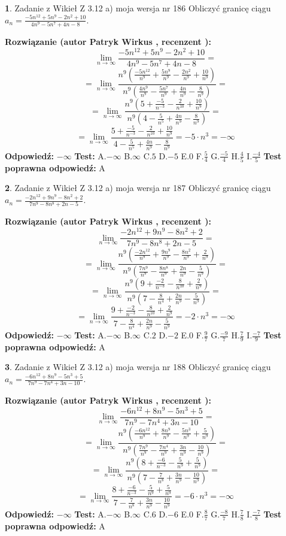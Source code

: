 \documentclass[12pt, a4paper]{article}
\theoremstyle{definition} %
\newtheorem{zad}{}
\newcommand{\zadStart}[1]{\begin{zad}#1\newline}
\newcommand{\zadStop}{\end{zad}}
\newcommand{\rozwStart}[2]{\noindent \textbf{Rozwiązanie (autor #1 , recenzent #2): }\newline}
\newcommand{\rozwStop}{\newline}
\newcommand{\odpStart}{\noindent \textbf{Odpowiedź:}\newline}
\newcommand{\odpStop}{\newline}
\newcommand{\testStart}{\noindent \textbf{Test:}\newline}
\newcommand{\testStop}{\newline}
\newcommand{\kluczStart}{\noindent \textbf{Test poprawna odpowiedź:}\newline}
\newcommand{\kluczStop}{\newline}
\begin{document}
\zadStart{Zadanie z Wikieł Z 3.12 a) moja wersja nr 186}
Obliczyć granicę ciągu $a_{n}=\frac{-5n^{12}+5n^{9}-2n^{2}+10}{4n^{9}-5n^{7}+4n-8}$.
\zadStop
\rozwStart{Patryk Wirkus}{}
$$\lim\limits_{n\to\infty}\frac{-5n^{12}+5n^{9}-2n^{2}+10}{4n^{9}-5n^{7}+4n-8}=$$
$$=\lim\limits_{n\to\infty}\frac{n^{9}\left(\frac{-5n^{12}}{n^{9}}+\frac{5n^{9}}{n^{9}}-\frac{2n^{2}}{n^{9}}+\frac{10}{n^{9}}\right)}{n^{9}\left(\frac{4n^{9}}{n^{9}}-\frac{5n^{7}}{n^{9}}+\frac{4n}{n^{9}}-\frac{8}{n^{9}}\right)}=$$
$$=\lim\limits_{n\to\infty}\frac{n^{9}\left(5+\frac{-5}{n^{-3}}-\frac{2}{n^{10}}+\frac{10}{n^{9}}\right)}
{n^{9}\left(4-\frac{5}{n^{5}}+\frac{4n}{n^{9}}-\frac{8}{n^{9}}\right)}=$$
$$=\lim\limits_{n\to\infty}\frac{5+\frac{-5}{n^{-3}}-\frac{2}{n^{10}}+\frac{10}{n^{9}}}{4-\frac{5}{n^{5}}+\frac{4n}{n^{9}}-\frac{8}{n^{9}}}=-5\cdot n^{3} = -\infty$$
\rozwStop
\odpStart
$-\infty$
\odpStop
\testStart
A.$-\infty$
B.$\infty$
C.$5$
D.$-5$
E.$0$
F.$\frac{5}{4}$
G.$\frac{-5}{4}$
H.$\frac{4}{5}$
I.$\frac{-4}{5}$
\testStop
\kluczStart
A
\kluczStop



\zadStart{Zadanie z Wikieł Z 3.12 a) moja wersja nr 187}
Obliczyć granicę ciągu $a_{n}=\frac{-2n^{12}+9n^{9}-8n^{2}+2}{7n^{9}-8n^{8}+2n-5}$.
\zadStop
\rozwStart{Patryk Wirkus}{}
$$\lim\limits_{n\to\infty}\frac{-2n^{12}+9n^{9}-8n^{2}+2}{7n^{9}-8n^{8}+2n-5}=$$
$$=\lim\limits_{n\to\infty}\frac{n^{9}\left(\frac{-2n^{12}}{n^{9}}+\frac{9n^{9}}{n^{9}}-\frac{8n^{2}}{n^{9}}+\frac{2}{n^{9}}\right)}{n^{9}\left(\frac{7n^{9}}{n^{9}}-\frac{8n^{8}}{n^{9}}+\frac{2n}{n^{9}}-\frac{5}{n^{9}}\right)}=$$
$$=\lim\limits_{n\to\infty}\frac{n^{9}\left(9+\frac{-2}{n^{-3}}-\frac{8}{n^{10}}+\frac{2}{n^{9}}\right)}
{n^{9}\left(7-\frac{8}{n^{4}}+\frac{2n}{n^{9}}-\frac{5}{n^{9}}\right)}=$$
$$=\lim\limits_{n\to\infty}\frac{9+\frac{-2}{n^{-3}}-\frac{8}{n^{10}}+\frac{2}{n^{9}}}{7-\frac{8}{n^{4}}+\frac{2n}{n^{9}}-\frac{5}{n^{9}}}=-2\cdot n^{3} = -\infty$$
\rozwStop
\odpStart
$-\infty$
\odpStop
\testStart
A.$-\infty$
B.$\infty$
C.$2$
D.$-2$
E.$0$
F.$\frac{9}{7}$
G.$\frac{-9}{7}$
H.$\frac{7}{9}$
I.$\frac{-7}{9}$
\testStop
\kluczStart
A
\kluczStop



\zadStart{Zadanie z Wikieł Z 3.12 a) moja wersja nr 188}
Obliczyć granicę ciągu $a_{n}=\frac{-6n^{12}+8n^{9}-5n^{3}+5}{7n^{9}-7n^{4}+3n-10}$.
\zadStop
\rozwStart{Patryk Wirkus}{}
$$\lim\limits_{n\to\infty}\frac{-6n^{12}+8n^{9}-5n^{3}+5}{7n^{9}-7n^{4}+3n-10}=$$
$$=\lim\limits_{n\to\infty}\frac{n^{9}\left(\frac{-6n^{12}}{n^{9}}+\frac{8n^{9}}{n^{9}}-\frac{5n^{3}}{n^{9}}+\frac{5}{n^{9}}\right)}{n^{9}\left(\frac{7n^{9}}{n^{9}}-\frac{7n^{4}}{n^{9}}+\frac{3n}{n^{9}}-\frac{10}{n^{9}}\right)}=$$
$$=\lim\limits_{n\to\infty}\frac{n^{9}\left(8+\frac{-6}{n^{-3}}-\frac{5}{n^{9}}+\frac{5}{n^{9}}\right)}
{n^{9}\left(7-\frac{7}{n^{8}}+\frac{3n}{n^{9}}-\frac{10}{n^{9}}\right)}=$$
$$=\lim\limits_{n\to\infty}\frac{8+\frac{-6}{n^{-3}}-\frac{5}{n^{9}}+\frac{5}{n^{9}}}{7-\frac{7}{n^{8}}+\frac{3n}{n^{9}}-\frac{10}{n^{9}}}=-6\cdot n^{3} = -\infty$$
\rozwStop
\odpStart
$-\infty$
\odpStop
\testStart
A.$-\infty$
B.$\infty$
C.$6$
D.$-6$
E.$0$
F.$\frac{8}{7}$
G.$\frac{-8}{7}$
H.$\frac{7}{8}$
I.$\frac{-7}{8}$
\testStop
\kluczStart
A
\kluczStop
\end{document}
